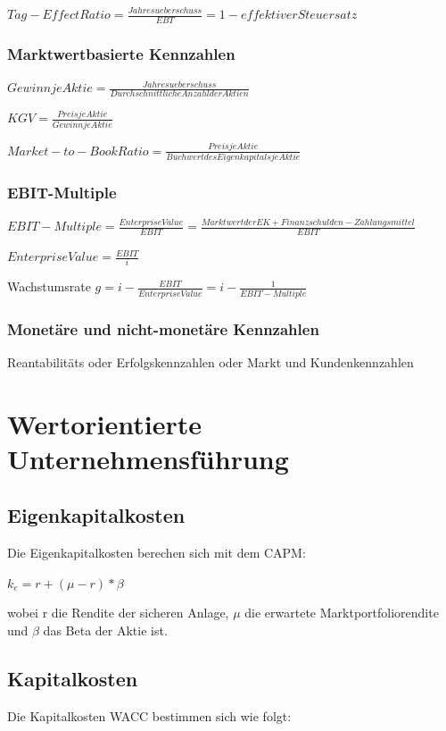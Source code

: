 \documentclass{article}
\begin{document}
$Tag-Effect Ratio = \frac{Jahresueberschuss}{EBT} = 1 - effektiver Steuersatz $ 
 
\subsubsection{Marktwertbasierte Kennzahlen}

$Gewinn je Aktie = \frac{Jahresueberschuss}{Durchschnittliche Anzahl der Aktien}$

$KGV = \frac{Preis je Aktie}{Gewinn je Aktie}$

$Market-to-Book Ratio = \frac{Preis je Aktie}{Buchwert des Eigenkapitals je Aktie}$ 

\subsubsection{EBIT-Multiple}

$EBIT-Multiple = \frac{Enterprise Value}{EBIT} = \frac{Marktwert der EK + Finanzschulden - Zahlungsmittel}
{EBIT}$

$ Enterprise Value = \frac{EBIT}{i}$

Wachstumsrate $g = i - \frac{EBIT}{Enterprise Value} = i - \frac{1}{EBIT-Multiple}$


\subsubsection{Monetäre und nicht-monetäre Kennzahlen}
Reantabilitäts oder Erfolgskennzahlen oder Markt und Kundenkennzahlen


\section{Wertorientierte Unternehmensführung}

\subsection{Eigenkapitalkosten}
Die Eigenkapitalkosten berechen sich mit dem CAPM:

$ k_e = r + ( \mu - r ) * \beta $

wobei r die Rendite der sicheren Anlage, $ \mu $ die erwartete Marktportfoliorendite und  $ \beta $ das Beta der Aktie ist.

\subsection{Kapitalkosten}
Die Kapitalkosten WACC bestimmen sich wie folgt:
\end{document}
